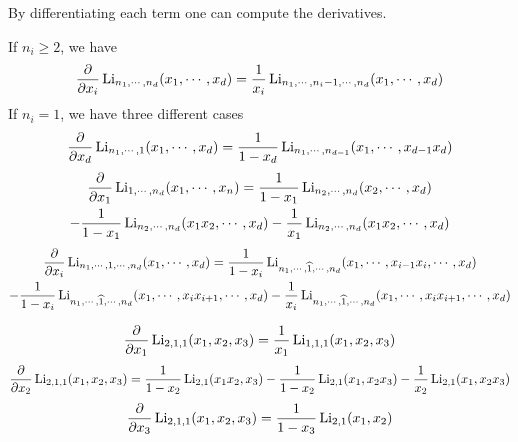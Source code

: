 By differentiating each term one can compute the derivatives.

\begin{proposition}\label{prop: derivatives for multiple polylog}
If $n_i\geq2$, we have
\begin{equation}
\frac{\partial}{\partial x_i}\operatorname{Li}_{n_1,\cdots,n_d}(x_1,\cdots,x_d)=\frac{1}{x_i}\operatorname{Li}_{n_1,\cdots,n_i-1,\cdots,n_d}(x_1,\cdots,x_d)
\end{equation}
If $n_i=1$, we have three different cases
\begin{equation}
\frac{\partial}{\partial x_d}\operatorname{Li}_{n_1,\cdots,1}(x_1,\cdots,x_d)=\frac{1}{1-x_d}\operatorname{Li}_{n_1,\cdots,n_{d-1}}(x_1,\cdots,x_{d-1}x_d)
\end{equation}
\begin{multline}
\frac{\partial}{\partial x_1}\operatorname{Li}_{1,\cdots,n_d}(x_1,\cdots,x_n)=\frac{1}{1-x_1}\operatorname{Li}_{n_2,\cdots,n_d}(x_2,\cdots,x_d)\\
-\frac{1}{1-x_1}\operatorname{Li}_{n_2,\cdots,n_d}(x_1x_2,\cdots,x_d)-\frac{1}{x_1}\operatorname{Li}_{n_2,\cdots,n_d}(x_1x_2,\cdots,x_d)
\end{multline}
\begin{multline}
\frac{\partial}{\partial x_i}\operatorname{Li}_{n_1,\cdots,1,\cdots,n_d}(x_1,\cdots,x_d)=\frac{1}{1-x_i}\operatorname{Li}_{n_1,\cdots,\widehat{1},\cdots,n_d}(x_1,\cdots,x_{i-1}x_i,\cdots,x_d)\\
-\frac{1}{1-x_i}\operatorname{Li}_{n_1,\cdots,\widehat{1},\cdots,n_d}(x_1,\cdots,x_ix_{i+1},\cdots,x_d)-\frac{1}{x_i}\operatorname{Li}_{n_1,\cdots,\widehat{1},\cdots,n_d}(x_1,\cdots,x_ix_{i+1},\cdots,x_d)
\end{multline}
\end{proposition}

\begin{example}
\begin{align*}
\frac{\partial}{\partial x_1}\operatorname{Li}_{2,1,1}(x_1,x_2,x_3)=\frac{1}{x_1}\operatorname{Li}_{1,1,1}(x_1,x_2,x_3)
\end{align*}
\begin{align*}
\frac{\partial}{\partial x_2}\operatorname{Li}_{2,1,1}(x_1,x_2,x_3)=\frac{1}{1-x_2}\operatorname{Li}_{2,1}(x_1x_2,x_3)-\frac{1}{1-x_2}\operatorname{Li}_{2,1}(x_1,x_2x_3)-\frac{1}{x_2}\operatorname{Li}_{2,1}(x_1,x_2x_3)
\end{align*}
\begin{align*}
\frac{\partial}{\partial x_3}\operatorname{Li}_{2,1,1}(x_1,x_2,x_3)=\frac{1}{1-x_3}\operatorname{Li}_{2,1}(x_1,x_2)\\
\end{align*}
\end{example}


